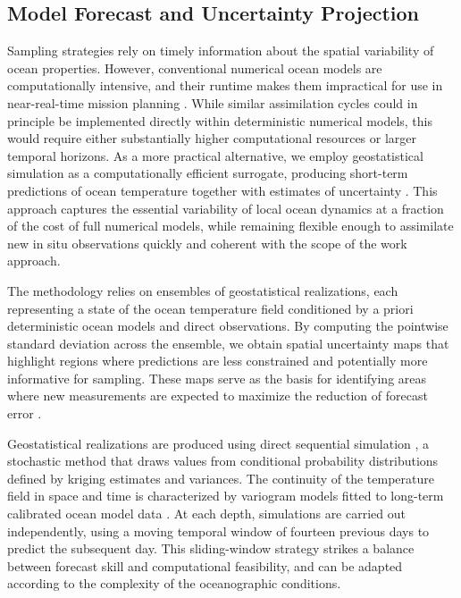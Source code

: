 \subsection{Model Forecast and Uncertainty Projection}

Sampling strategies rely on timely information about the spatial
variability of ocean properties. However, conventional numerical ocean
models are computationally intensive, and their runtime makes them
impractical for use in near-real-time mission planning . While similar assimilation cycles could in principle
be implemented directly within deterministic numerical models, this
would require either substantially higher computational resources or
larger temporal horizons. As a more practical alternative, we employ
geostatistical simulation as a computationally efficient surrogate,
producing short-term predictions of ocean temperature together with
estimates of uncertainty \cite{deutsch1992}. This approach captures
the essential variability of local ocean dynamics at a fraction of the
cost of full numerical models, while remaining flexible enough to
assimilate new in situ observations quickly \cite{Duarte2025} and
coherent with the scope of the work approach.

The methodology relies on ensembles of geostatistical realizations, each
representing a state of the ocean temperature field conditioned by a
priori deterministic ocean models \cite{CMEMS2017} and direct
observations. By computing the pointwise standard deviation across the
ensemble, we obtain spatial uncertainty maps that highlight regions
where predictions are less constrained and potentially more informative
for sampling. These maps serve as the basis for identifying areas where
new measurements are expected to maximize the reduction of forecast
error \cite{Duarte2025}.

Geostatistical realizations are produced using direct sequential
simulation \cite{soares2001direct}, a stochastic method that draws
values from conditional probability distributions defined by kriging
estimates and variances. The continuity of the temperature field in
space and time is characterized by variogram models fitted to long-term
calibrated ocean model data \cite{CMEMS2017}. At each depth, simulations
are carried out independently, using a moving temporal window of
fourteen previous days to predict the subsequent day. This
sliding-window strategy strikes a balance between forecast skill and
computational feasibility, and can be adapted according to the
complexity of the oceanographic conditions.

